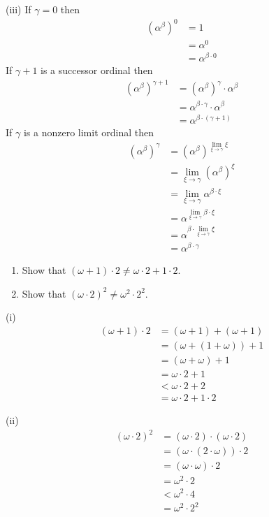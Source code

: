 \begin{solution}
(iii) If $\gamma = 0$ then
\begin{align*}
\left( \alpha^{\beta} \right)^0 &= 1 \\
&= \alpha^0 \\
&= \alpha^{\beta \cdot 0}
\end{align*}
If $\gamma + 1$ is a successor ordinal then
\begin{align*}
\left( \alpha^{\beta} \right)^{\gamma + 1} &= \left( \alpha^{\beta} 
  \right)^{\gamma} \cdot \alpha^{\beta} \\
&= \alpha^{\beta \cdot \gamma} \cdot \alpha^{\beta} \\
&= \alpha^{\beta \cdot \left( \gamma + 1 \right)}
\end{align*}
If $\gamma$ is a nonzero limit ordinal then
\begin{align*}
\left( \alpha^{\beta} \right)^{\gamma} &= \left( \alpha^{\beta} 
  \right)^{\lim_{\xi \rightarrow \gamma} \xi} \\
&= \lim_{\xi \rightarrow \gamma} \left( \alpha^{\beta} \right)^{\xi} \\
&= \lim_{\xi \rightarrow \gamma} \alpha^{\beta \cdot \xi} \\
&= \alpha^{\lim_{\xi \rightarrow \gamma} \beta \cdot \xi} \\
&= \alpha^{\beta \cdot \lim_{\xi \rightarrow \gamma} \xi} \\
&= \alpha^{\beta \cdot \gamma}
\end{align*}
\end{solution}

\begin{enumerate}[label=(\roman*)]
\item
Show that $\left( \omega + 1 \right) \cdot 2 \neq \omega \cdot 2 + 1 \cdot 2$.
\item
Show that $\left( \omega \cdot 2 \right)^2 \neq \omega^2 \cdot 2^2$.
\end{enumerate}
\begin{solution}
(i)
\begin{align*}
\left( \omega + 1 \right) \cdot 2 &= \left( \omega + 1 \right) + \left( \omega
  + 1 \right) \\
&= \left( \omega + \left( 1 + \omega \right) \right) + 1 \\
&= \left( \omega + \omega \right) + 1 \\
&= \omega \cdot 2 + 1 \\
&< \omega \cdot 2 + 2 \\
&= \omega \cdot 2 + 1 \cdot 2
\end{align*}

(ii)
\begin{align*}
\left( \omega \cdot 2 \right)^2 &= \left( \omega \cdot 2 \right) \cdot \left(
  \omega \cdot 2 \right) \\
&= \left( \omega \cdot \left( 2 \cdot \omega \right) \right) \cdot 2 \\
&= \left( \omega \cdot \omega \right) \cdot 2 \\
&= \omega^2 \cdot 2 \\
&< \omega^2 \cdot 4 \\
&= \omega^2 \cdot 2^2
\end{align*}
\end{solution}

